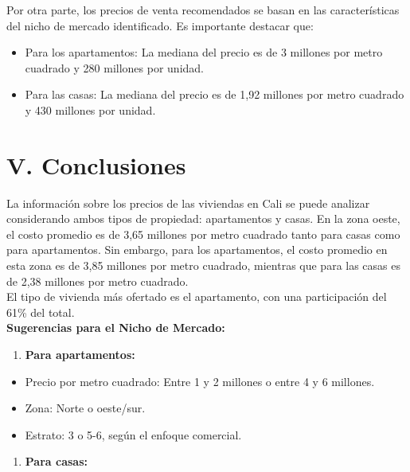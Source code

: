 \documentclass[conference,final,]{IEEEtran}
\providecommand{\tightlist}{%
  \setlength{\itemsep}{0pt}\setlength{\parskip}{0pt}}
\begin{document}
Por otra parte, los precios de venta recomendados se basan en las
características del nicho de mercado identificado. Es importante
destacar que:

\begin{itemize}
\tightlist
\item
  Para los apartamentos: La mediana del precio es de 3 millones por
  metro cuadrado y 280 millones por unidad.
\item
  Para las casas: La mediana del precio es de 1,92 millones por metro
  cuadrado y 430 millones por unidad.
\end{itemize}

\section{\textbf{V. Conclusiones}}

La información sobre los precios de las viviendas en Cali se puede
analizar considerando ambos tipos de propiedad: apartamentos y casas. En
la zona oeste, el costo promedio es de 3,65 millones por metro cuadrado
tanto para casas como para apartamentos. Sin embargo, para los
apartamentos, el costo promedio en esta zona es de 3,85 millones por
metro cuadrado, mientras que para las casas es de 2,38 millones por
metro cuadrado.\\

El tipo de vivienda más ofertado es el apartamento, con una
participación del 61\% del total.\\

\textbf{Sugerencias para el Nicho de Mercado:}

\begin{enumerate}
\def\labelenumi{\arabic{enumi}.}
\tightlist
\item
  \textbf{Para apartamentos:}
\end{enumerate}

\begin{itemize}
\tightlist
\item
  Precio por metro cuadrado: Entre 1 y 2 millones o entre 4 y 6
  millones.
\item
  Zona: Norte o oeste/sur.
\item
  Estrato: 3 o 5-6, según el enfoque comercial.
\end{itemize}

\begin{enumerate}
\def\labelenumi{\arabic{enumi}.}
\setcounter{enumi}{1}
\tightlist
\item
  \textbf{Para casas:}
\end{enumerate}
\end{document}
